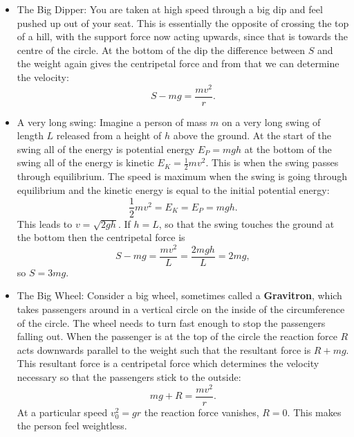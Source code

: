 \documentclass[a4paper,12pt]{book}
\begin{document}
\begin{itemize}
\setlength{\itemsep}{-5pt}
    \item The Big Dipper: You are taken at high speed through a big dip and feel pushed up out of your seat. This is essentially the opposite of crossing the top of a hill, with the support force now acting upwards, since that is towards the centre of the circle. At the bottom of the dip the difference between $S$ and the weight again gives the centripetal force and from that we can determine the velocity:
    \begin{equation*}
    S-mg=\frac{mv^{2}}{r}.
    \end{equation*}
    \item A very long swing: Imagine a person of mass $m$ on a very long swing of length $L$ released from a height of $h$ above the ground. At the start of the swing all of the energy is potential energy $E_{P}=mgh$ at the bottom of the swing all of the energy is kinetic $E_{K}=\frac{1}{2}mv^{2}$. This is when the swing passes through equilibrium. The speed is maximum when the swing is going through equilibrium and the kinetic energy is equal to the initial potential energy:
    \begin{equation*}
    \frac{1}{2}mv^{2}=E_{K}=E_{P}=mgh.
    \end{equation*}
This leads to $v=\sqrt{2gh}$.
If $h=L$, so that the swing touches the ground at the bottom then the centripetal force is
\begin{equation*}
S-mg=\frac{mv^{2}}{L}=\frac{2mgh}{L}=2mg,
\end{equation*}
so $S=3mg$.
\item The Big Wheel: Consider a big wheel, sometimes called a \textbf{Gravitron}, which takes passengers around in a vertical circle on the inside of the circumference of the circle. The wheel needs to turn fast enough to stop the passengers falling out. When the passenger is at the top of the circle the reaction force $R$ acts downwards parallel to the weight such that the resultant force is $R+mg$. This resultant force is a centripetal force which determines the velocity necessary so that the passengers stick to the outside:
\begin{equation*}
mg+R=\frac{mv^{2}}{r}.
\end{equation*}
At a particular speed $v_{0}^{2}=gr$ the reaction force vanishes, $R=0$. This makes the person feel weightless.
\end{itemize} 
\end{document}
